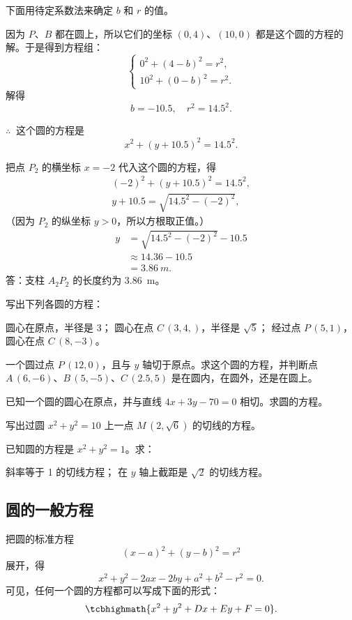 \medskip
下面用待定系数法来确定 $b$ 和 $r$ 的值。

因为 $P$、$B$ 都在圆上，所以它们的坐标 $(0,4)$、$(10,0)$ 都是这个圆的方程的解。于是得到方程组：
\[\begin{cases} 0^2+(4-b)^2=r^2,\\10^2+(0-b)^2=r^2. \end{cases}\]
解得
\[b=-10.5,\quad r^2=14.5^2.\]

$\therefore\ $ 这个圆的方程是
\[ x^2+(y+10.5)^2=14.5^2.\]

把点 $P_2$ 的横坐标 $x=-2$ 代入这个圆的方程，得
\begin{gather*}
  (-2)^2+(y+10.5)^2=14.5^2,\\
  y+10.5=\sqrt{14.5^2-(-2)^2},
\end{gather*}
（因为 $P_2$ 的纵坐标 $y>0$，所以方根取正值。）
\begin{align*}
  y&= \sqrt{14.5^2-(-2)^2} -10.5\\
  &\approx 14.36-10.5 \\
  &= \qty{3.86}{m}.
\end{align*}
答：支柱 $A_2P_2$ 的长度约为 \qty{3.86}{m}。

\begin{Practice}
  \begin{question}
    \item 写出下列各圆的方程：
    \begin{tasks}
      \task 圆心在原点，半径是 3；
      \task 圆心在点 $C\,(3,4,)$，半径是 $\sqrt{5}$；
      \task 经过点 $P\,(5,1)$，圆心在点 $C\,(8,-3)$。
    \end{tasks}
    \item 一个圆过点 $P\,(12,0)$，且与 $y$ 轴切于原点。求这个圆的方程，并判断点 $A\,(6,-6)$、$B\,(5,-5)$、$C\,(2.5,5)$ 是在圆内，在圆外，还是在圆上。
    \item 已知一个圆的圆心在原点，并与直线 $4x+3y-70=0$ 相切。求圆的方程。
    \item 写出过圆 $x^2+y^2=10$ 上一点 $M\,(2,\sqrt{6})$ 的切线的方程。
    \item 已知圆的方程是 $x^2+y^2=1$。求：
    \begin{tasks}
      \task 斜率等于 1 的切线方程；
      \task 在 $y$ 轴上截距是 $\sqrt{2}$ 的切线方程。
    \end{tasks}
  \end{question}
\end{Practice}

\subsection{圆的一般方程}
把圆的标准方程
\[(x-a)^2+(y-b)^2=r^2\]
展开，得
\[x^2+y^2-2ax-2by+a^2+b^2-r^2=0.\]
可见，任何一个圆的方程都可以写成下面的形式：
\begin{equation}
  \label{eq:circle_general_equation}
  \tcbhighmath{x^2+y^2+Dx+Ey+F=0}.
\end{equation}

